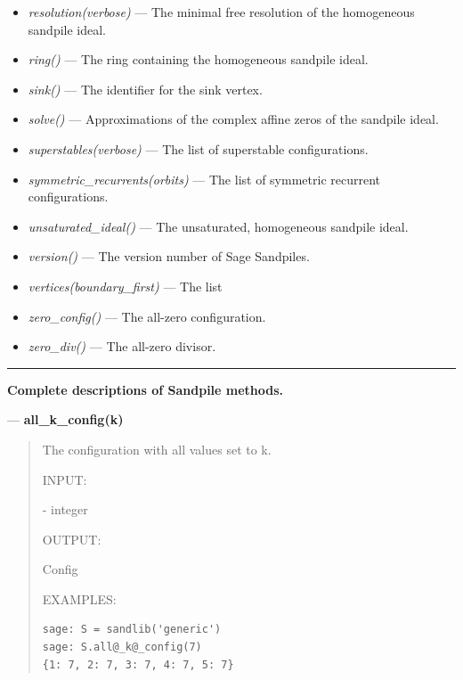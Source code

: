 \documentclass[letterpaper,10pt,english]{manual}
\begin{document}
\begin{itemize}
\item {} 
\emph{resolution(verbose)} --- The
minimal free resolution of the homogeneous sandpile ideal.

\item {} 
\emph{ring()} --- The ring containing the homogeneous sandpile ideal.

\item {} 
\emph{sink()} --- The identifier for the sink vertex.

\item {} 
\emph{solve()} --- Approximations of the complex affine zeros of the sandpile ideal.

\item {} 
\emph{superstables(verbose)} --- The list of
superstable configurations.

\item {} 
\emph{symmetric\_recurrents(orbits)} --- The list of symmetric recurrent configurations.

\item {} 
\emph{unsaturated\_ideal()} --- The unsaturated, homogeneous sandpile ideal.

\item {} 
\emph{version()} --- The version number of Sage Sandpiles.

\item {} 
\emph{vertices(boundary\_first)} --- The list

\item {} 
\emph{zero\_config()} --- The all-zero configuration.

\item {} 
\emph{zero\_div()} --- The all-zero divisor.

\end{itemize}


\bigskip\hrule{}\bigskip


\textbf{Complete descriptions of Sandpile methods.}

---
\hypertarget{all-k-config-k}{}
\textbf{all\_k\_config(k)}
\begin{quote}

The configuration with all values set to k.

INPUT:

 - integer

OUTPUT:

Config

EXAMPLES:

\begin{Verbatim}[commandchars=@\[\]]
sage: S = sandlib('generic')
sage: S.all@_k@_config(7)
{1: 7, 2: 7, 3: 7, 4: 7, 5: 7}
\end{Verbatim}
\end{quote}
\end{document}

